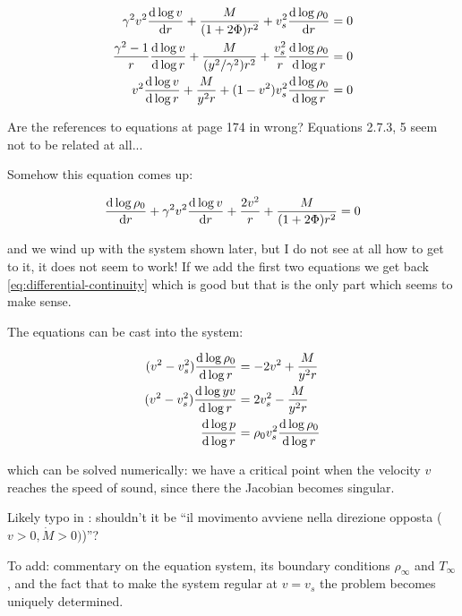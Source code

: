 \documentclass[main.tex]{subfiles}
\begin{document}
\begin{subequations}
\begin{align}
  \gamma^2 v^2 \dv{\log v}{r} + \frac{M}{(1+ 2 \Phi) r^2} + v_s^2 \dv{\log \rho_0}{r}  &= 0 \\
  \frac{\gamma^2 - 1}{r}  \dv{\log v}{\log r} + \frac{M}{(y^2/\gamma^2) r^2}
  + \frac{v_s^2}{r} \dv{\log \rho_0}{\log r}  &= 0  \\
  v^2  \dv{\log v}{\log r} + \frac{M}{y^2 r}
  + (1-v^2) v_s^2 \dv{\log \rho_0}{\log r}  &= 0
\end{align}
\end{subequations}

\begin{greenbox}
  Are the references to equations at page 174 in \cite{Nobili:2000} wrong? Equations 2.7.3, 5 seem not to be related at all...

  Somehow this equation comes up:

  \begin{equation}
    \dv{\log \rho_0 }{r} + \gamma^2 v^2 \dv{\log v }{r}  + \frac{2 v^2}{r} + \frac{M}{(1+2 \Phi) r^2} = 0
  \end{equation}

  and we wind up with the system shown later,
  but I do not see at all how to get to it, it does not seem to work!
  If we add the first two equations we get back \eqref{eq:differential-continuity} which is good but that is the only part which seems to make sense.
\end{greenbox}

The equations can be cast into the system:

\begin{subequations}
\begin{align}
  (v^2-v_s^2) \dv{\log \rho_0}{\log r} &= - 2v^2 + \frac{M}{y^2 r}  \\
  (v^2-v_s^2) \dv{\log yv }{\log r} &=  2v_s^2 - \frac{M}{y^2 r}  \\
  \dv{\log p }{\log r} &= \rho_0 v_s^2 \dv{\log \rho_0}{\log r }
\end{align}
\end{subequations}

which can be solved numerically: we have a critical point when the velocity \(v\) reaches the speed of sound, since there the Jacobian becomes singular.

\begin{greenbox}
  Likely typo in \cite[page 175]{Nobili:2000}: shouldn't it be ``il movimento avviene nella direzione opposta (\(v>0, \dot{M}>0)\))''?
\end{greenbox}

\begin{greenbox}
  To add: commentary on the equation system, its boundary conditions \(\rho_\infty\) and \(T_\infty\), and the fact that to make the system regular at \(v = v_s\) the problem becomes uniquely determined.
\end{greenbox}
\end{document}
